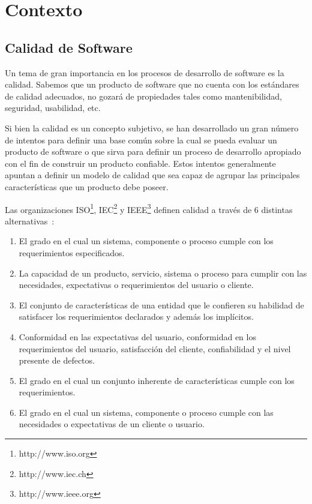
\chapter{Contexto}
\label{chap:contexto}
\section{Calidad de Software}
Un tema de gran importancia en los procesos de desarrollo de software es la calidad.
Sabemos que un producto de software que no cuenta con los estándares de
calidad adecuados, no gozará de propiedades tales como mantenibilidad, seguridad, 
usabilidad, etc.

Si bien la calidad es un concepto subjetivo, se han desarrollado un gran
número de intentos para definir una base común sobre la cual se pueda evaluar un producto 
de software o que sirva para definir un proceso de desarrollo apropiado con el fin de construir
un producto confiable. Estos intentos generalmente apuntan a definir un modelo
de calidad que sea capaz de agrupar las principales características que un producto debe poseer.

Las organizaciones ISO\footnote{http://www.iso.org}, IEC\footnote{http://www.iec.ch} y IEEE\footnote{http://www.ieee.org} 
definen calidad a través de 6 distintas alternativas~\cite{5276043}:
\begin{enumerate}
    \item El grado en el cual un sistema, componente o proceso cumple con los requerimientos especificados.
    \item La capacidad de un producto, servicio, sistema o proceso para cumplir con las necesidades, expectativas
    o requerimientos del usuario o cliente.
    \item El conjunto de características de una entidad que le confieren su habilidad de satisfacer los requerimientos
    declarados y además los implícitos.
    \item Conformidad en las expectativas del usuario, conformidad en los requerimientos del usuario, satisfacción del cliente,
    confiabilidad y el nivel presente de defectos.
    \item El grado en el cual un conjunto inherente de características cumple con los requerimientos.
    \item El grado en el cual un sistema, componente o proceso cumple con las necesidades o expectativas de un cliente o usuario.
\end{enumerate}

